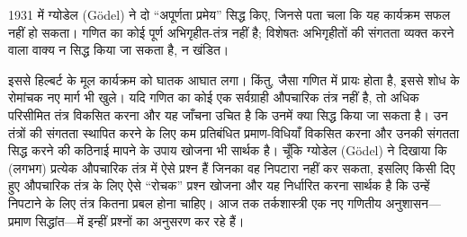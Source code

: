 \documentclass[../../../include/open-logic-section]{subfiles}
\begin{document}
1931 में ग्योडेल (G\"odel) ने दो ``अपूर्णता प्रमेय'' सिद्ध किए, जिनसे पता चला
कि यह कार्यक्रम सफल नहीं हो सकता। गणित का कोई पूर्ण अभिगृहीत-तंत्र नहीं है;
विशेषतः अभिगृहीतों की संगतता व्यक्त करने वाला वाक्य न सिद्ध किया जा सकता है,
न खंडित।

इससे हिल्बर्ट के मूल कार्यक्रम को घातक आघात लगा। किंतु, जैसा गणित में प्रायः
होता है, इससे शोध के रोमांचक नए मार्ग भी खुले। यदि गणित का कोई एक सर्वग्राही
औपचारिक तंत्र नहीं है, तो अधिक परिसीमित तंत्र विकसित करना और यह जाँचना उचित
है कि उनमें क्या सिद्ध किया जा सकता है। उन तंत्रों की संगतता स्थापित करने के
लिए कम प्रतिबंधित प्रमाण-विधियाँ विकसित करना और उनकी संगतता सिद्ध करने की
कठिनाई मापने के उपाय खोजना भी सार्थक है। चूँकि ग्योडेल (G\"odel) ने दिखाया
कि (लगभग) प्रत्येक औपचारिक तंत्र में ऐसे प्रश्न हैं जिनका वह निपटारा नहीं कर
सकता, इसलिए किसी दिए हुए औपचारिक तंत्र के लिए ऐसे ``रोचक'' प्रश्न खोजना और
यह निर्धारित करना सार्थक है कि उन्हें निपटाने के लिए तंत्र कितना प्रबल होना
चाहिए। आज तक तर्कशास्त्री एक नए गणितीय अनुशासन—प्रमाण सिद्धांत—में इन्हीं
प्रश्नों का अनुसरण कर रहे हैं।
\end{document}
